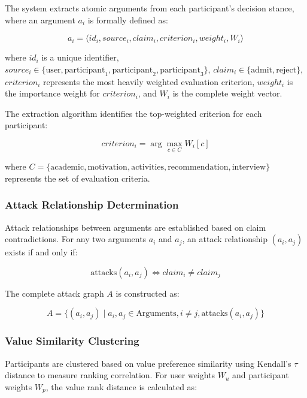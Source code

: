 \documentclass[conference]{IEEEtran}
\begin{document}
The system extracts atomic arguments from each participant's decision stance, where an argument $a_i$ is formally defined as:

\begin{equation}
a_i = \langle id_i, source_i, claim_i, criterion_i, weight_i, W_i \rangle
\end{equation}

where $id_i$ is a unique identifier, $source_i \in \{\text{user}, \text{participant}_1, \text{participant}_2, \text{participant}_3\}$, $claim_i \in \{\text{admit}, \text{reject}\}$, $criterion_i$ represents the most heavily weighted evaluation criterion, $weight_i$ is the importance weight for $criterion_i$, and $W_i$ is the complete weight vector.

The extraction algorithm identifies the top-weighted criterion for each participant:

\begin{equation}
criterion_i = \arg\max_{c \in C} W_i[c]
\end{equation}

where $C = \{\text{academic}, \text{motivation}, \text{activities}, \text{recommendation}, \text{interview}\}$ represents the set of evaluation criteria.

\subsubsection{Attack Relationship Determination}

Attack relationships between arguments are established based on claim contradictions. For any two arguments $a_i$ and $a_j$, an attack relationship $(a_i, a_j)$ exists if and only if:

\begin{equation}
\text{attacks}(a_i, a_j) \iff claim_i \neq claim_j
\end{equation}

The complete attack graph $A$ is constructed as:

\begin{equation}
A = \{(a_i, a_j) \mid a_i, a_j \in \text{Arguments}, i \neq j, \text{attacks}(a_i, a_j)\}
\end{equation}

\subsubsection{Value Similarity Clustering}

Participants are clustered based on value preference similarity using Kendall's $\tau$ distance to measure ranking correlation. For user weights $W_u$ and participant weights $W_p$, the value rank distance is calculated as:
\end{document}
